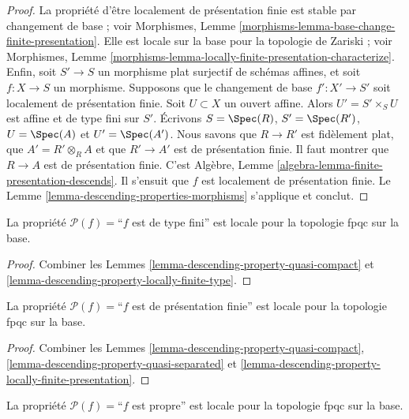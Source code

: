 \begin{proof}
La propriété d'être localement de présentation finie est stable par
changement de base ; voir Morphismes, Lemme
\ref{morphisms-lemma-base-change-finite-presentation}. Elle est locale sur la
base pour la topologie de Zariski ; voir Morphismes, Lemme
\ref{morphisms-lemma-locally-finite-presentation-characterize}. Enfin, soit
$S' \to S$ un morphisme plat surjectif de schémas affines, et soit
$f : X \to S$ un morphisme. Supposons que le changement de base
$f' : X' \to S'$ soit localement de présentation finie. Soit $U \subset X$
un ouvert affine. Alors $U' = S' \times_S U$ est affine et de type fini sur
$S'$. Écrivons $S = \Spec(R)$, $S' = \Spec(R')$, $U = \Spec(A)$ et
$U' = \Spec(A')$. Nous savons que $R \to R'$ est fidèlement plat, que
$A' = R' \otimes_R A$ et que $R' \to A'$ est de présentation finie. Il faut
montrer que $R \to A$ est de présentation finie. C'est Algèbre, Lemme
\ref{algebra-lemma-finite-presentation-descends}. Il s'ensuit que $f$ est
localement de présentation finie. Le
Lemme \ref{lemma-descending-properties-morphisms} s'applique et conclut.
\end{proof}

\begin{lemma}
\label{lemma-descending-property-finite-type}
La propriété $\mathcal{P}(f) =$``$f$ est de type fini''
est locale pour la topologie fpqc sur la base.
\end{lemma}

\begin{proof}
Combiner les Lemmes \ref{lemma-descending-property-quasi-compact}
et \ref{lemma-descending-property-locally-finite-type}.
\end{proof}

\begin{lemma}
\label{lemma-descending-property-finite-presentation}
La propriété $\mathcal{P}(f) =$``$f$ est de présentation finie''
est locale pour la topologie fpqc sur la base.
\end{lemma}

\begin{proof}
Combiner les Lemmes \ref{lemma-descending-property-quasi-compact},
\ref{lemma-descending-property-quasi-separated} et
\ref{lemma-descending-property-locally-finite-presentation}.
\end{proof}

\begin{lemma}
\label{lemma-descending-property-proper}
La propriété $\mathcal{P}(f) =$``$f$ est propre''
est locale pour la topologie fpqc sur la base.
\end{lemma}

